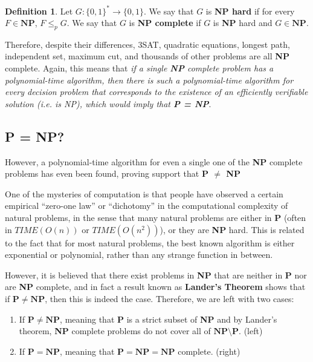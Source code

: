 \documentclass[a4paper, 12pt]{report}
\theoremstyle{remark}
\theoremstyle{definition}
\newtheorem{definition}{Definition}[section]
\begin{document}
\begin{definition}
Let $G: \{0,1\}^* \longrightarrow \{0,1\}$. We say that $G$ is \textbf{NP hard} if for every $F \in \mathbf{NP}$, $F \leq_p G$. We say that $G$ is \textbf{NP complete} if $G$ is \textbf{NP} hard and $G \in \mathbf{NP}$. 
\end{definition}

Therefore, despite their differences, 3SAT, quadratic equations, longest path, independent set, maximum cut, and thousands of other problems are all \textbf{NP} complete. Again, this means that \textit{if a single \textbf{NP} complete problem has a polynomial-time algorithm, then there is such a polynomial-time algorithm for every decision problem that corresponds to the existence of an efficiently verifiable solution (i.e. is NP), which would imply that \textbf{P = NP}}.

\subsection{P = NP?}
However, a polynomial-time algorithm for even a single one of the \textbf{NP} complete problems has even been found, proving support that \textbf{P $\neq$ NP}

One of the mysteries of computation is that people have observed a certain empirical “zero-one law” or “dichotomy” in the computational complexity of natural problems, in the sense that many natural problems are either in \textbf{P} (often in $TIME(O(n))$ or $TIME(O(n^2))$), or they are \textbf{NP} hard. This is related to the fact that for most natural problems, the best known algorithm is either exponential or polynomial, rather than any strange function in between. 

However, it is believed that there exist problems in \textbf{NP} that are neither in \textbf{P} nor are \textbf{NP} complete, and in fact a result known as \textbf{Lander's Theorem} shows that if $\mathbf{P \neq NP}$, then this is indeed the case. Therefore, we are left with two cases:
\begin{enumerate}
    \item If $\mathbf{P} \neq \mathbf{NP}$, meaning that \textbf{P} is a strict subset of \textbf{NP} and by Lander's theorem, \textbf{NP} complete problems do not cover all of $\mathbf{NP} \setminus \mathbf{P}$. (left)
    \item If $\mathbf{P} = \mathbf{NP}$, meaning that $\mathbf{P} = \mathbf{NP} = \mathbf{NP}$ complete. (right)
\end{enumerate}
\begin{center}
\end{center}
\end{document}
